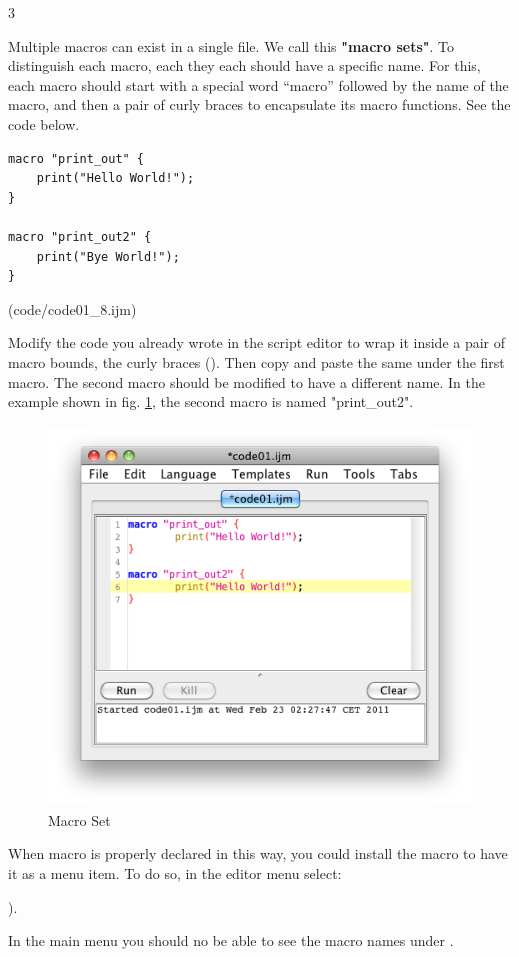 \begin{indentexercise}
{3}
\item Multiple macros can exist in a single file. We call this \textbf{"macro sets"}. To distinguish each macro, each they each should have a specific name. For this, each macro should start with a special word ``macro'' followed by the name of the macro, and then a pair of curly braces to encapsulate its macro functions. See the code below.  


\begin{lstlisting}
macro "print_out" {
	print("Hello World!");
}

macro "print_out2" {
	print("Bye World!");
}

\end{lstlisting}
(code/code01_8.ijm)

Modify the code you already wrote in the script editor to wrap it inside a pair of macro bounds, the curly braces (\ilcom{\{\}}).  Then copy and paste the same under the first macro. 
The second macro should be modified to have a different name. In the example shown in fig.
\ref{fig_MacroSetInMenu}, the second macro is named "print\_out2".
\begin{figure}[htbp]
\begin{center}
\includegraphics[scale=0.6]{fig/editor_MacroSet.png}
\caption{Macro Set} \label{fig_MacroSetInMenu}
\end{center}
\end{figure}
When macro is properly declared in this way, you could install the macro to have it as a menu item. To do so, in the editor menu select: 
\begin{indentFiji}
).
\end{indentFiji}
In the main menu you should no be able to see the macro names under .


\end{indentexercise}
